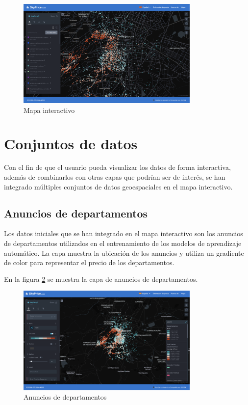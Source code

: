 \begin{figure}[H]
    \centering
    \includegraphics[width=0.8\textwidth]{imagenes/05-mapa-interactivo/mapa-interactivo.png}
    \caption{Mapa interactivo}
    \label{fig:mapa-interactivo}
\end{figure}

\section{Conjuntos de datos}
Con el fin de que el usuario pueda visualizar los datos de forma interactiva,
además de combinarlos con otras capas que podrían ser de interés, se han
integrado múltiples conjuntos de datos geoespaciales en el mapa interactivo.

\subsection{Anuncios de departamentos}
Los datos iniciales que se han integrado en el mapa interactivo son los
anuncios de departamentos utilizados en el entrenamiento de los modelos de
aprendizaje automático. La capa muestra la ubicación de los anuncios y utiliza
un gradiente de color para representar el precio de los departamentos.

En la figura \ref{fig:anuncios-departamentos} se muestra la capa de anuncios de
departamentos.

\begin{figure}[H]
    \centering
    \includegraphics[width=0.8\textwidth]{imagenes/05-mapa-interactivo/anuncios-departamentos.png}
    \caption{Anuncios de departamentos}
    \label{fig:anuncios-departamentos}
\end{figure}

